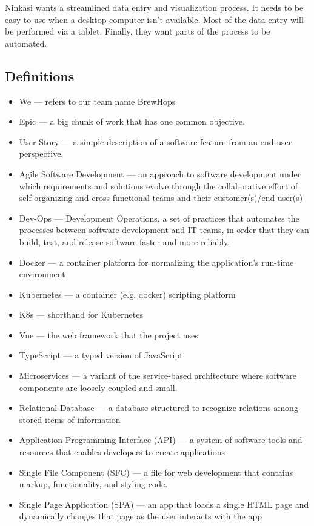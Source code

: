         Ninkasi wants a streamlined data entry and visualization process.  It needs to be easy to use when a desktop computer isn't available.  Most of the data entry will be performed via a tablet.  Finally, they want parts of the process to be automated.

    \subsection{Definitions}
    \begin{itemize}
        \item We --- refers to our team name BrewHops
        \item Epic --- a big chunk of work that has one common objective.
        \item User Story --- a simple description of a software feature from an end-user perspective.
        \item Agile Software Development --- an approach to software development under which requirements and solutions evolve through the collaborative effort of self-organizing and cross-functional teams and their customer(s)/end user(s)
        \item Dev-Ops --- Development Operations, a set of practices that automates the processes between software development and IT teams, in order that they can build, test, and release software faster and more reliably.
        \item Docker --- a container platform for normalizing the application's run-time environment \cite{docker}
        \item Kubernetes --- a container (e.g. docker) scripting platform \cite{kubernetes}
        \item K8s --- shorthand for Kubernetes
        \item Vue --- the web framework that the project uses \cite{react}
        \item TypeScript --- a typed version of JavaScript \cite{typescript}
        \item Microservices --- a variant of the service-based architecture where software components are loosely coupled and small.
        \item Relational Database --- a database structured to recognize relations among stored items of information
        \item Application Programming Interface (API) --- a system of software tools and resources that enables developers to create applications 
        \item Single File Component (SFC) --- a file for web development that contains markup, functionality, and styling code.
        \item Single Page Application (SPA) --- an app that loads a single HTML page and dynamically changes that page as the user interacts with the app
    \end{itemize}

